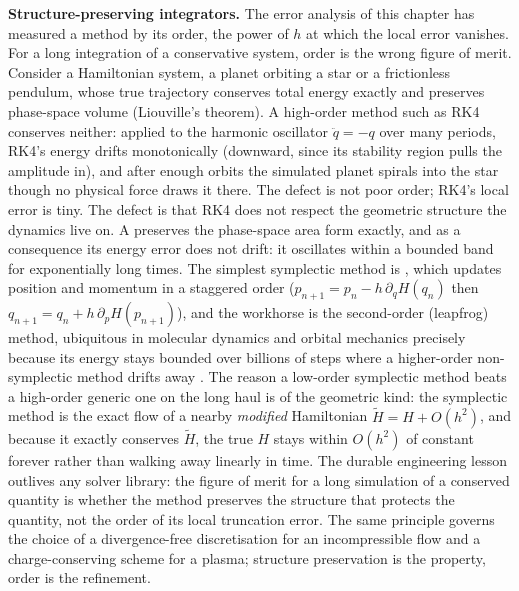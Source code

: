 \begin{mastery}
\textbf{Structure-preserving integrators.} The error analysis of this
chapter has measured a method by its order, the power of $h$ at which the
local error vanishes. For a long integration of a conservative system, order
is the wrong figure of merit. Consider a Hamiltonian system, a planet
orbiting a star or a frictionless pendulum, whose true trajectory conserves
total energy exactly and preserves phase-space volume (Liouville's theorem).
A high-order method such as RK4 conserves neither: applied to the harmonic
oscillator $\ddot q = -q$ over many periods, RK4's energy drifts
monotonically (downward, since its stability region pulls the amplitude in),
and after enough orbits the simulated planet spirals into the star though no
physical force draws it there. The defect is not poor order; RK4's local
error is tiny. The defect is that RK4 does not respect the geometric
structure the dynamics live on. A  preserves
the phase-space area form exactly, and as a consequence its energy error
does not drift: it oscillates within a bounded band for exponentially long
times. The simplest symplectic method is , which
updates position and momentum in a staggered order ($p_{n+1} = p_{n} -
h\,\partial_{q}H(q_{n})$ then $q_{n+1} = q_{n} + h\,\partial_{p}H(p_{n+1})$),
and the workhorse is the second-order  (leapfrog)
method, ubiquitous in molecular dynamics and orbital mechanics precisely
because its energy stays bounded over billions of steps where a
higher-order non-symplectic method drifts away
\cite[ch.~1]{text:v2ch07-hairer-lubich-wanner-geometric}. The reason a
low-order symplectic method beats a high-order generic one on the long haul
is  of the geometric kind: the symplectic
method is the exact flow of a nearby \emph{modified} Hamiltonian
$\tilde H = H + O(h^{2})$, and because it exactly conserves $\tilde H$, the
true $H$ stays within $O(h^{2})$ of constant forever rather than walking
away linearly in time. The durable engineering lesson outlives any solver
library: the figure of merit for a long simulation of a conserved quantity
is whether the method preserves the structure that protects the quantity,
not the order of its local truncation error. The same principle governs the
choice of a divergence-free discretisation for an incompressible flow and a
charge-conserving scheme for a plasma; structure preservation is the
property, order is the refinement.
\end{mastery}

